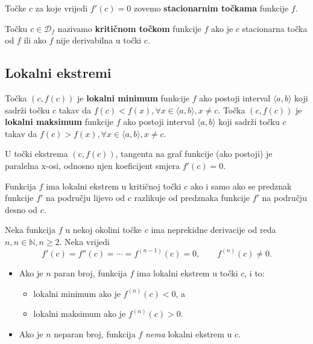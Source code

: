 Točke $c$ za koje vrijedi $f'(c)=0$ zovemo \textbf{stacionarnim točkama}
funkcije $f$.

Točku $c\in \mathcal{D}_f$ nazivamo \textbf{kritičnom točkom} funkcije $f$ ako
je $c$ stacionarna točka od $f$ ili ako $f$ nije derivabilna u točki $c$.

\subsection{Lokalni ekstremi}

\begin{definition}
    Točka $(c, f(c))$ je \textbf{lokalni minimum} funkcije $f$ ako postoji
    interval $\langle a,b \rangle$ koji sadrži točku $c$ takav da
    $f(c)<f(x),\forall x \in \langle a,b \rangle, x\neq c$.
    Točka $(c, f(c))$ je \textbf{lokalni maksimum} funkcije $f$ ako postoji
    interval $\langle a,b \rangle$ koji sadrži točku $c$ takav da
    $f(c)>f(x),\forall x \in \langle a,b \rangle, x\neq c$.
\end{definition}

U točki ekstrema $(c, f(c))$, tangenta na graf funkcije (ako postoji) je
paralelna x-osi, odnosno njen koeficijent smjera $f'(c) = 0$.

Funkcija $f$ ima lokalni ekstrem u kritičnoj točki $c$ ako i samo ako se
predznak funkcije $f'$ na području lijevo od $c$ razlikuje od predznaka funkcije
$f'$ na području desno od $c$.

\begin{theorem}
    Neka funkcija $f$ u nekoj okolini točke $c$ ima neprekidne derivacije od
    reda $n, n\in\mathbb{N},n\geq 2$.
    Neka vrijedi
    $$
    f'(c)=f''(c)=\cdots=f^{(n-1)}(c)=0,\qquad f^{(n)}(c)\neq 0.
    $$

    \begin{itemize}
        \item Ako je $n$ paran broj, funkcija $f$ ima lokalni ekstrem u točki $c$, i to:
        \begin{itemize}
            \item lokalni minimum ako je $f^{(n)}(c)<0$, a
            \item lokalni maksimum ako je $f^{(n)}(c)>0$.
        \end{itemize}
        \item Ako je $n$ neparan broj, funkcija $f$ \textit{nema} lokalni
        ekstrem u $c$.
    \end{itemize}
\end{theorem}

